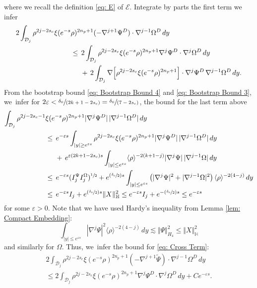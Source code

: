 \documentclass[10pt]{amsart}
\newcommand{\Psfrac}[2]{(\sfrac{#1}{#2})}
\newcommand{\spfrac}[2]{\sfrac{#1}{(#2)}}
\theoremstyle{plain}
\theoremstyle{definition}
\begin{document}
where we recall the definition \eqref{eq: E} of $\mathcal E$. Integrate by parts the first term we infer
\begin{equation}
\label{eq: Cross Term}
\begin{aligned}
2\int_{\mathcal D_j} \rho^{2j-2s_c}\xi(e^{-s}&\rho)^{2n_p+1}(-\nabla^{j+1} \Psi^D)\cdot\nabla^{j-1}\Omega^D\,dy\\
&\le \,2\int_{\mathcal D_j} \rho^{2j-2s_c}\xi(e^{-s}\rho)^{2n_p+1}\nabla^j\Psi^D\cdot\nabla^j\Omega^D\,dy\\
&\hspace*{.5cm}+\,2\int_{\mathcal D_j} \nabla\Big[\rho^{2j-2s_c}\xi(e^{-s}\rho)^{2n_p+1}\Big]\cdot\nabla^j\Psi^D\,\nabla^{j-1}\Omega^D\,dy.
\end{aligned}
\end{equation}
From the bootstrap bound \eqref{eq: Bootstrap Bound 4} and \eqref{eq: Bootstrap Bound 3}, we~infer for $2\varepsilon<\spfrac{\delta_0}{2k+1-2s_c}=\spfrac{\delta_0}{7-2s_c}$, the bound for the last term above
\[
\begin{aligned}
\int_{\mathcal D_j} \rho^{2j-2s_c-1}&\xi(e^{-s}\rho)^{2n_p+1}|\nabla^j \Psi^D| \,|\nabla^{j-1}\Omega^D|\,dy\\
&\le \, e^{-\varepsilon s}\int_{|y|\ge e^{\varepsilon s}} \rho^{2j-2s_c}\xi(e^{-s}\rho)^{2n_p+1}|\nabla^j \Psi^D |\,|\nabla^{j-1}\Omega^D|\,dy\\
&\hspace*{.5cm}+\,e^{\varepsilon(2k+1-2s_c)s}\int_{|y|\le e^{\varepsilon s}} \langle\rho\rangle^{-2(k+1-j)}|\nabla^j\Psi |\,|\nabla^{j-1}\Omega|\,dy\\
&\le \,e^{-\varepsilon s}(I_j^\Psi I_j^\Omega)^{\sfrac{1}{2}}+e^{\Psfrac{\delta_0}{2} s}\int_{|y|\le e^{\varepsilon s}}\left(|\nabla^j \Psi |^2+|\nabla^{j-1}\Omega |^2\right)\langle\rho\rangle^{-2(4-j)}\,dy\\
&\le \,e^{-\varepsilon s}I_j+e^{\Psfrac{\delta_0}{2}s}\Vert X\Vert_{\mathbb H}^2\le e^{-\varepsilon s}I_j+e^{-\Psfrac{\delta_0}{2}s}\le e^{-\varepsilon s}
\end{aligned}
\]
for some $\varepsilon>0$. Note that we have used Hardy's inequality from Lemma \ref{lem: Compact Embedding}:
\begin{equation}
\label{eq: Hardy on Psi}
\int_{|y|\le e^{\varepsilon s}}|\nabla^j \Psi |^2\langle\rho\rangle^{-2(4-j)}\,dy\lesssim\Vert \Psi\Vert_{H_4}^2 \le\Vert X\Vert_{\mathbb H}^2
\end{equation}
and similarly for $\Omega$. Thus, we~infer the bound for \eqref{eq: Cross Term}:
\begin{multline*}
2\int_{\mathcal D_j} \rho^{2j-2s_c}\xi(e^{-s}\rho)^{2n_p+1}(-\nabla^{j+1} \tilde \Psi) \cdot\nabla^{j-1}\Omega^D\,dy\\
\le 2\int_{\mathcal D_j} \rho^{2j-2s_c}\xi(e^{-s}\rho)^{2n_p+1}\nabla^j\Psi^D\cdot\nabla^j\Omega^D\,dy+C e^{-\varepsilon s}.
\end{multline*}
\end{document}
